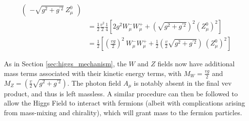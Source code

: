 \begin{equation}
\begin{split}
\begin{pmatrix}
                     - \sqrt{g^2 + g^{\prime 2}}\ Z^0_{\mu}
                \end{pmatrix} \\
            & = \frac{1}{2} \frac{v^2}{2} \frac{1}{4} 
                \left[ 2 g^2  W^-_{\mu} W^+_{\mu}
                + \left(\sqrt{g^2 + g^{\prime 2}}\right)^2 (Z^0_{\mu})^2 \right] \\
            & = \frac{1}{2} \left[ \left(\frac{vg}{2}\right)^2\  W^-_{\mu} W^+_{\mu}
                + \frac{1}{2} \left(\frac{v}{2}\sqrt{g^2 + g^{\prime 2}}\right)\ (Z^0_{\mu})^2 \right]
        \end{split} \end{equation}

        As in Section \ref{sec:higgs_mechanism}, the $W$ and $Z$ fields now have additional mass terms associated with their kinetic energy terms,
            with $M_W = \frac{vg}{2}$ and $M_Z = \left(\frac{v}{2}\sqrt{g^2 + g^{\prime 2}}\right) $.
        The photon field $A_{\mu}$ is notably absent in the final vev product, and thus is left massless.
        A similar procedure can then be followed to allow the Higgs Field to interact with fermions
            (albeit with complications arising from mass-mixing and chirality), which will grant mass to the fermion particles.


        





